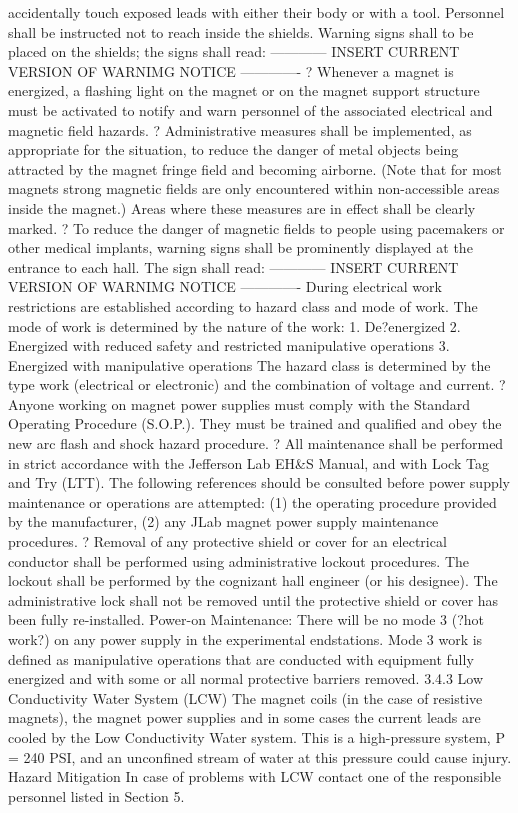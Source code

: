 { 			accidentally touch exposed leads with either their body or with a tool. Personnel
 			shall be instructed not to reach inside the shields. Warning signs shall to be
 			placed on the shields; the signs shall read:
    ------------ INSERT  CURRENT VERSION OF WARNIMG NOTICE  -------------
	? 	Whenever a magnet is energized, a flashing light on the magnet or on the magnet support structure must be activated to notify and warn personnel of the associated electrical and magnetic field hazards.
	? 	Administrative measures shall be implemented, as appropriate for the situation, to reduce the danger of metal objects being attracted by the magnet fringe field and becoming airborne. (Note that for most magnets strong magnetic fields are only encountered within non-accessible areas inside the magnet.) Areas where these measures are in effect shall be clearly marked.
	? 	To reduce the danger of magnetic fields to people using pacemakers or other medical implants, warning signs shall be prominently displayed at the entrance to each hall. The sign shall read:
    ------------ INSERT  CURRENT VERSION OF WARNIMG NOTICE  -------------
	During electrical work restrictions are established according to hazard class and mode of work. The mode of work is determined by the nature of the work:
	1. 	De?energized
	2. 	Energized with reduced safety and restricted manipulative operations
	3. 	Energized with manipulative operations
The hazard class is determined by the type work (electrical or electronic) and the combination of voltage and current.
	? 	Anyone working on magnet power supplies must comply with the Standard Operating Procedure (S.O.P.). They must be trained and qualified and obey the new arc flash and shock hazard procedure.
	? 	All maintenance shall be performed in strict accordance with the Jefferson Lab EH\&S Manual, and with Lock Tag and Try (LTT). The following references should be consulted before power supply maintenance or operations are attempted: (1) the operating procedure provided by the manufacturer, (2) any JLab magnet power supply maintenance procedures.
	? 	Removal of any protective shield or cover for an electrical conductor shall be performed using administrative lockout procedures. The lockout shall be performed by the cognizant hall engineer (or his designee). The administrative lock shall not be removed until the protective shield or cover has been fully re-installed.
	Power-on Maintenance: There will be no mode 3 (?hot work?) on any power supply in the experimental endstations. Mode 3 work is defined as manipulative operations that are conducted with equipment fully energized and with some or all normal protective barriers removed.
3.4.3		Low Conductivity Water System (LCW)
	The magnet coils (in the case of resistive magnets), the magnet power supplies and in some cases the current leads are cooled by the Low Conductivity Water system. This is a high-pressure system, P = 240 PSI, and an unconfined stream of water at this pressure could cause injury.
Hazard Mitigation	
	In case of problems with LCW contact one of the responsible personnel listed in Section 5.

}
